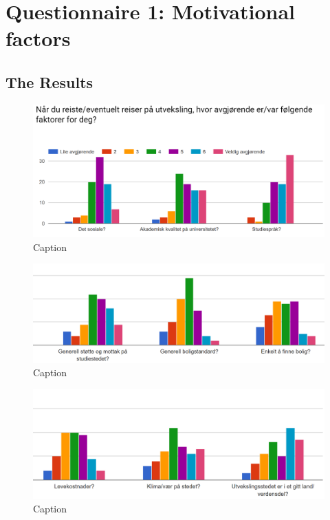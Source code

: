 \chapter{Questionnaire 1: Motivational factors}
\label{app:questionnaire1}

\FloatBarrier
\section{The Results}

\begin{figure}[h]
    \centering
    \includegraphics[width=1\textwidth]{fig/form1/results/slide1.PNG}
    \caption[]{Caption}
    \label{fig:my_label}
\end{figure}

\begin{figure}[h]
    \centering
    \includegraphics[width=1\textwidth]{fig/form1/results/slide2.PNG}
    \caption[]{Caption}
    \label{fig:my_label}
\end{figure}

\begin{figure}[h]
    \centering
    \includegraphics[width=1\textwidth]{fig/form1/results/slide3.PNG}
    \caption[]{Caption}
    \label{fig:my_label}
\end{figure}


